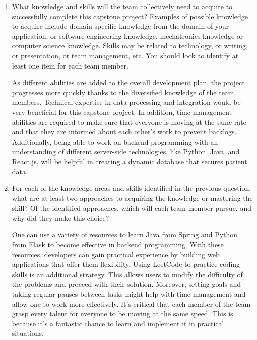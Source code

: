 \documentclass[12pt]{article}
\begin{document}
\begin{enumerate}
  \item What knowledge and skills will the team collectively need to acquire to
  successfully complete this capstone project?  Examples of possible knowledge
  to acquire include domain specific knowledge from the domain of your
  application, or software engineering knowledge, mechatronics knowledge or
  computer science knowledge.  Skills may be related to technology, or writing,
  or presentation, or team management, etc.  You should look to identify at
  least one item for each team member.

  As different abilities are added to the overall development plan, the project progresses more quickly thanks to the diversified knowledge of the team members. Technical expertise in data processing and integration would be very beneficial for this capstone project. In addition, time management abilities are required to make sure that everyone is moving at the same rate and that they are informed about each other's work to prevent backlogs. Additionally, being able to work on backend programming with an understanding of different server-side technologies, like Python, Java, and React.js, will be helpful in creating a dynamic database that secures patient data. 

  \item For each of the knowledge areas and skills identified in the previous
  question, what are at least two approaches to acquiring the knowledge or
  mastering the skill?  Of the identified approaches, which will each team
  member pursue, and why did they make this choice?

  One can use a variety of resources to learn Java from Spring and Python from Flask to become effective in backend programming. With these resources, developers can gain practical experience by building web applications that offer them flexibility. Using LeetCode to practice coding skills is an additional strategy. This allows users to modify the difficulty of the problems and proceed with their solution. Moreover, setting goals and taking regular pauses between tasks might help with time management and allow one to work more effectively. It's critical that each member of the team grasp every talent for everyone to be moving at the same speed. This is because it's a fantastic chance to learn and implement it in practical situations. 

\end{enumerate}
\end{document}
